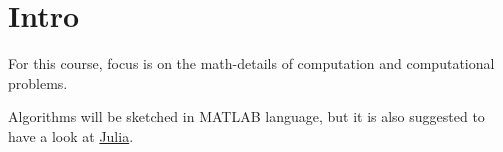 \section{Intro}
For this course, focus is on the math-details of computation and computational problems.

Algorithms will be sketched in MATLAB language, but it is also suggested to have a look at \href{http://www.julialang.org}{Julia}.

